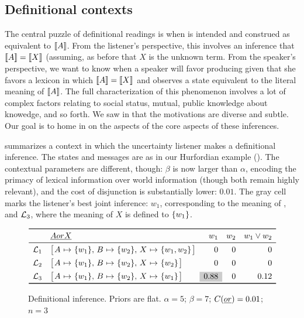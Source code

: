 \documentclass{article}
\begin{document}

\subsection{Definitional contexts}\label{sec:analysis:definitional}

The central puzzle of definitional readings is when  is
intended and construed as equivalent to $\llbracket A\rrbracket$. From the listener's
perspective, this involves an inference that $\llbracket A\rrbracket=\llbracket X\rrbracket$
(assuming, as before that $X$ is the unknown term. From the speaker's
perspective, we want to know when a speaker will favor producing
 given that she favors a lexicon in which
$\llbracket A\rrbracket=\llbracket X\rrbracket$ and observes a state equivalent to the literal
meaning of $\llbracket A\rrbracket$. The full characterization of this phenomenon
involves a lot of complex factors relating to social status, mutual,
public knowledge about knowedge, and so forth. We saw in
 that the motivations are diverse and subtle. Our
goal is to home in on the aspects of the core aspects of these
inferences.

 summarizes a context in which the uncertainty
listener makes a definitional inference. The states and messages are
as in our Hurfordian example (). The contextual
parameters are different, though: $\beta$ is now larger than $\alpha$,
encoding the primacy of lexical information over world information
(though both remain highly relevant), and the cost of disjunction is
substantially lower: $0.01$. The gray cell marks the listener's
best joint inference: $w_{1}$, corresponding to the meaning of ,
and $\mathcal{L}_{3}$, where the meaning of $X$ is defined to $\left\{ w_{1} \right\}$.

\begin{figure}[tp]
  \centering
  $\begin{array}[c]{l l r r r}
    \toprule
      & \word{A or X}  & w_{1} & w_{2} & w_{1} \vee w_{2} \\
    \midrule
    \Lex_{1} & \smallhurfordlex{w_{1}}{w_{2}}{w_{1}, w_{2}} & 0 & 0 & 0 \\[1ex]
    \Lex_{2} & \smallhurfordlex{w_{1}}{w_{2}}{w_{2}}        & 0 & 0 & 0 \\[1ex]
    \Lex_{3} & \smallhurfordlex{w_{1}}{w_{2}}{w_{1}}        & \graycell{0.88} & 0 & 0.12\\
    \bottomrule
  \end{array}$
  \caption{Definitional inference.
    Priors are flat. 
    $\alpha = 5$; 
    $\beta = 7$; 
    $C(\emph{or}) = 0.01$; 
    $n = 3$}
  \label{fig:def}
\end{figure}
\end{document}
